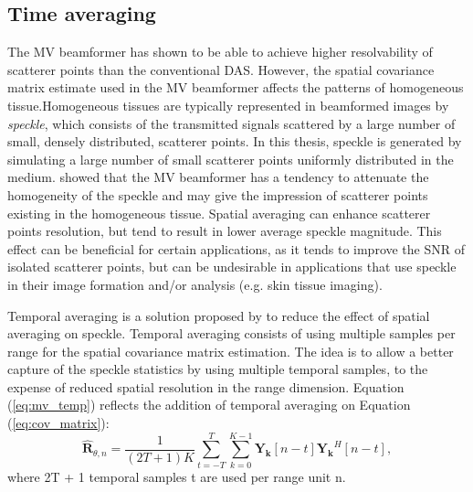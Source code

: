 \subsection{Time averaging}
\label{sec:time_averaging}
The MV beamformer has shown to be able to achieve higher resolvability of scatterer points than the conventional DAS. However, the spatial covariance matrix estimate used in the MV beamformer affects the patterns of homogeneous tissue.Homogeneous tissues are typically represented in beamformed images by \textit{speckle}, which consists of the transmitted signals scattered by a large number of small, densely distributed, scatterer points. In this thesis, speckle is generated by simulating a large number of small scatterer points uniformly distributed in the medium.
\cite{speckle} showed that the MV beamformer has a tendency to attenuate the homogeneity of the speckle and may give the impression of scatterer points existing in the homogeneous tissue.
Spatial averaging can enhance scatterer points resolution, but tend to result in lower average speckle magnitude. This effect can be beneficial for certain applications, as it tends to improve the SNR of isolated scatterer points, but can be undesirable in applications that use speckle in their image formation and/or analysis (e.g. skin tissue imaging).

Temporal averaging is a solution proposed by \cite{speckle} to reduce the effect of spatial averaging on speckle. Temporal averaging consists of using multiple samples per range for the spatial covariance matrix estimation. The idea is to allow a better capture of the speckle statistics by using multiple temporal samples, to the expense of reduced spatial resolution in the range dimension. Equation (\ref{eq:mv_temp}) reflects the addition of temporal averaging on Equation (\ref{eq:cov_matrix}):
\begin{equation}
    \boldsymbol{\hat{R}}_{\theta, n} = \frac{1}{(2T + 1) K} \sum_{t=-T}^{T} \sum_{k=0}^{K-1} \boldsymbol{Y_k}[n - t] \boldsymbol{Y_k}^H[n - t],
\label{eq:mv_temp}
\end{equation}
\noindent
where 2T + 1 temporal samples t are used per range unit n.



